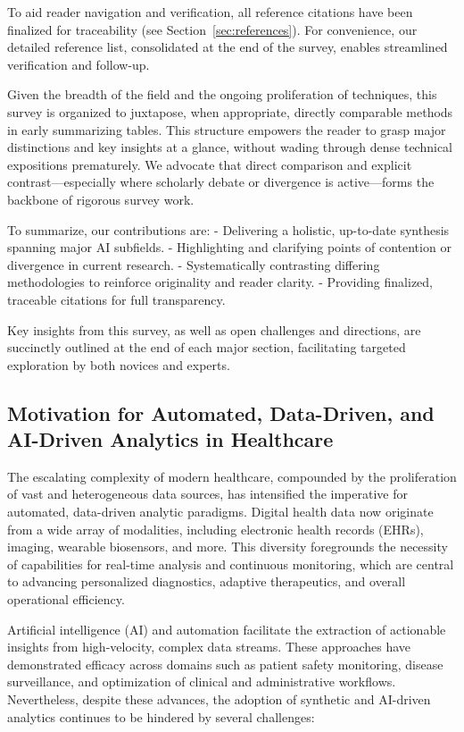 \documentclass[sigconf]{acmart}
\begin{document}
To aid reader navigation and verification, all reference citations have been finalized for traceability (see Section~\ref{sec:references}). For convenience, our detailed reference list, consolidated at the end of the survey, enables streamlined verification and follow-up.

Given the breadth of the field and the ongoing proliferation of techniques, this survey is organized to juxtapose, when appropriate, directly comparable methods in early summarizing tables. This structure empowers the reader to grasp major distinctions and key insights at a glance, without wading through dense technical expositions prematurely. We advocate that direct comparison and explicit contrast---especially where scholarly debate or divergence is active---forms the backbone of rigorous survey work.

To summarize, our contributions are:
- Delivering a holistic, up-to-date synthesis spanning major AI subfields.
- Highlighting and clarifying points of contention or divergence in current research.
- Systematically contrasting differing methodologies to reinforce originality and reader clarity.
- Providing finalized, traceable citations for full transparency.

Key insights from this survey, as well as open challenges and directions, are succinctly outlined at the end of each major section, facilitating targeted exploration by both novices and experts.

\subsection{Motivation for Automated, Data-Driven, and AI-Driven Analytics in Healthcare}

The escalating complexity of modern healthcare, compounded by the proliferation of vast and heterogeneous data sources, has intensified the imperative for automated, data-driven analytic paradigms. Digital health data now originate from a wide array of modalities, including electronic health records (EHRs), imaging, wearable biosensors, and more. This diversity foregrounds the necessity of capabilities for real-time analysis and continuous monitoring, which are central to advancing personalized diagnostics, adaptive therapeutics, and overall operational efficiency.

Artificial intelligence (AI) and automation facilitate the extraction of actionable insights from high-velocity, complex data streams. These approaches have demonstrated efficacy across domains such as patient safety monitoring, disease surveillance, and optimization of clinical and administrative workflows. Nevertheless, despite these advances, the adoption of synthetic and AI-driven analytics continues to be hindered by several challenges:
\end{document}
